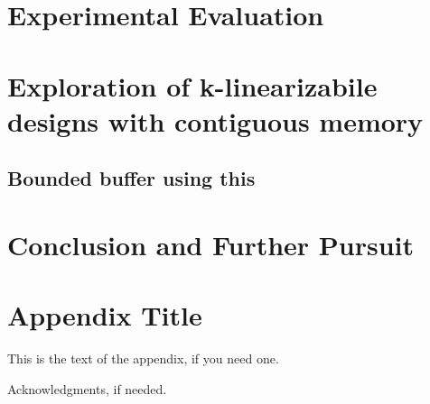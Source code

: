\documentclass{sigplanconf}
\begin{document}
\section{Experimental Evaluation}

\section{Exploration of k-linearizabile designs with contiguous memory}
\subsection{Bounded buffer using this}

\section{Conclusion and Further Pursuit}

\appendix
\section{Appendix Title}

This is the text of the appendix, if you need one.

\acks

Acknowledgments, if needed.





%
%
%
\end{document}
